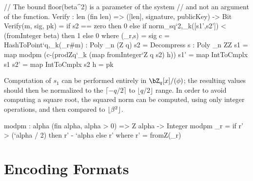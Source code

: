 
\begin{code}
  // The bound floor(beta^2) is a parameter of the system
  // and not an argument of the function.
  Verify : {len} (fin len) => ([len], signature, publicKey) -> Bit
  Verify(m, sig, pk) = 
    if s2 == zero then
      0
    else if norm_sq`{2,_k}([s1',s2']) < (fromInteger beta) then
      1
    else
      0
    where 
      (_r,s) = sig
      c = HashToPoint`{q,_k}(_r#m) : Poly _n (Z q)
      s2 = Decompress s : Poly _n ZZ
      s1 = map modpm (c-(prodZq`{_k} (map fromInteger`{Z q} s2) h))
      s1' = map IntToCmplx s1
      s2' = map IntToCmplx s2
      h = pk
\end{code}

Computation of $s_1$ can be performed entirely in $\bZ_q[x]/(\phi)$; the
resulting values should then be normalized to the $\lceil -q/2 \rceil$
to $\lfloor q/2 \rfloor$ range.
In order to avoid computing a square root, the squared norm can be computed, using only integer operations,
and then compared to $\lfloor \beta^2 \rfloor$.

\begin{code}
  modpm : {alpha} (fin alpha, alpha > 0) => Z alpha -> Integer
  modpm _r = if r' > (`alpha / 2) then r' - `alpha else r'
    where r' = fromZ(_r)
\end{code}



\section{Encoding Formats} \label{sec:spec:encode}

